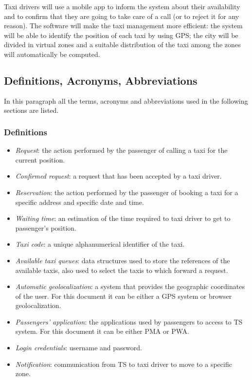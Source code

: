Taxi drivers will use a mobile app to inform the system about their
availability and to confirm that they are going to take care of a
call (or to reject it for any reason). The software will make the
taxi management more efficient: the system will be able to identify
the position of each taxi by using GPS; the city will be divided in
virtual zones and a suitable distribution of the taxi among the zones
will automatically be computed.


\subsection{Definitions, Acronyms, Abbreviations}

In this paragraph all the terms, acronyms and abbreviations used in
the following sections are listed.


\subsubsection{Definitions}
\begin{itemize}
\item \emph{Request}: the action performed by the passenger of calling a
taxi for the current position.
\item \emph{Confirmed request}: a request that has been accepted by a taxi
driver.
\item \emph{Reservation}: the action performed by the passenger of booking
a taxi for a specific address and specific date and time.
\item \emph{Waiting time}: an estimation of the time required to taxi driver
to get to passenger's position.
\item \emph{Taxi code}: a unique alphanumerical identifier of the taxi.
\item \emph{Available taxi queues}: data structures used to store the references
of the available taxis, also used to select the taxis to which forward
a request.
\item \emph{Automatic geolocalization}: a system that provides the geographic
coordinates of the user. For this document it can be either a GPS
system or browser geolocalization.
\item \emph{Passengers' application}: the applications used by passengers
to access to TS system. For this document it can be either PMA or
PWA.
\item \emph{Login credentials}: username and password.
\item \textit{Notification}: communication from TS to taxi driver to move
to a specific zone.
\end{itemize}

